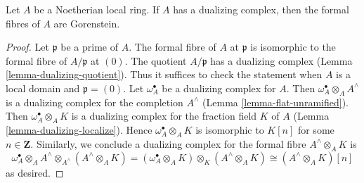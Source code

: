 \begin{lemma}
\label{lemma-dualizing-gorenstein-formal-fibres}
Let $A$ be a Noetherian local ring. If $A$ has a dualizing complex,
then the formal fibres of $A$ are Gorenstein.
\end{lemma}

\begin{proof}
Let $\mathfrak p$ be a prime of $A$. The formal fibre of $A$ at $\mathfrak p$
is isomorphic to the formal fibre of $A/\mathfrak p$ at $(0)$. The quotient
$A/\mathfrak p$ has a dualizing complex
(Lemma \ref{lemma-dualizing-quotient}).
Thus it suffices to check the statement
when $A$ is a local domain and $\mathfrak p = (0)$.
Let $\omega_A^\bullet$ be a dualizing complex for $A$. Then
$\omega_A^\bullet \otimes_A A^\wedge$ is a dualizing complex
for the completion $A^\wedge$
(Lemma \ref{lemma-flat-unramified}).
Then $\omega_A^\bullet \otimes_A K$ is a dualizing
complex for the fraction field $K$ of $A$
(Lemma \ref{lemma-dualizing-localize}).
Hence $\omega_A^\bullet \otimes_A K$
is isomorphic to $K[n]$ for some $n \in \mathbf{Z}$.
Similarly, we conclude a dualizing complex for the formal fibre
$A^\wedge \otimes_A K$ is
$$
\omega_A^\bullet \otimes_A A^\wedge \otimes_{A^\wedge} (A^\wedge \otimes_A K) =
(\omega_A^\bullet \otimes_A K) \otimes_K (A^\wedge \otimes_A K) \cong
(A^\wedge \otimes_A K)[n]
$$
as desired.
\end{proof}
